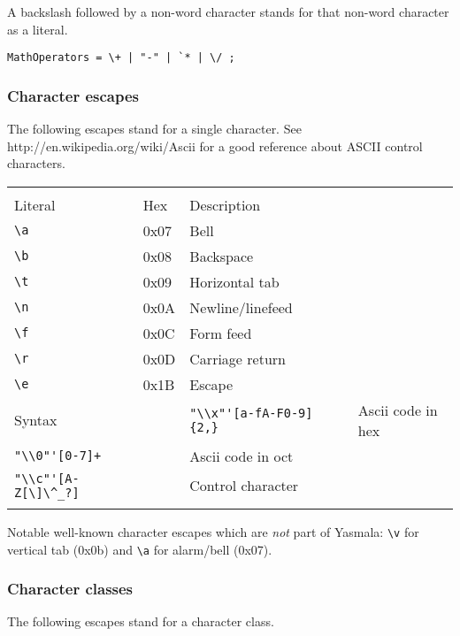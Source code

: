 \documentclass[a4paper]{report}
\begin{document}
A backslash followed by a non-word character stands for that non-word character
as a literal. 

\begin{verbatim}
MathOperators = \+ | "-" | `* | \/ ;
\end{verbatim}


\subsubsection{Character escapes}

The following escapes stand for a single character. See
http://en.wikipedia.org/wiki/Ascii for a good reference about ASCII control
characters. 

\begin{tabular}{p{2cm}p{1cm}p{8.5cm}}
  & \\
Literal   & Hex  & Description  \\
\verb|\a| & 0x07 & Bell \\
\verb|\b| & 0x08 & Backspace \\
\verb|\t| & 0x09 & Horizontal tab \\
\verb|\n| & 0x0A & Newline/linefeed \\
\verb|\f| & 0x0C & Form feed \\
\verb|\r| & 0x0D & Carriage return \\
\verb|\e| & 0x1B & Escape \\

Syntax    &      &
\verb|"\\x"'[a-fA-F0-9]{2,}| & & Ascii code in hex\\
\verb|"\\0"'[0-7]+|      & & Ascii code in oct \\
\verb|"\\c"'[A-Z[\]\^_?]|      & & Control character \\
 & \\
\end{tabular}

Notable well-known character escapes which are \emph{not} part of Yasmala: \verb|\v|
for vertical tab (0x0b) and \verb|\a| for alarm/bell (0x07).

\subsubsection{Character classes}

The following escapes stand for a character class.
\end{document}
